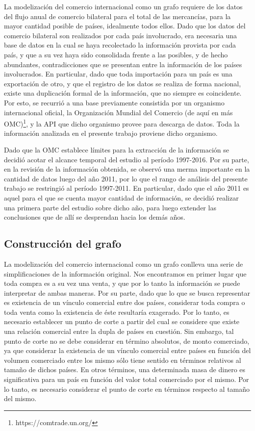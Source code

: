 \documentclass[runningheads,a4paper]{llncs}
\begin{document}
La modelización del comercio internacional como un grafo requiere de los datos del flujo anual de comercio bilateral para el total de las mercancías, para la mayor cantidad posible de países, idealmente todos ellos. Dado que los datos del comercio bilateral son realizados por cada país involucrado, era necesaria una base de datos en la cual se haya recolectado la información provista por cada país, y que a su vez haya sido consolidada frente a las posibles, y de hecho abundantes, contradicciones que se presentan entre la información de los países involucrados. En particular, dado que toda importación para un país es una exportación de otro, y que el registro de los datos se realiza de forma nacional, existe una duplicación formal de la información, que no siempre es coincidente. Por esto, se recurrió a una base previamente consistida por un organismo internacional oficial, la Organización Mundial del Comercio (de aquí en más OMC)\footnote{https://comtrade.un.org/}, y la API que dicho organismo provee para descarga de datos. Toda la información analizada en el presente trabajo proviene dicho organismo.   

Dado que la OMC establece límites para la extracción de la información se decidió acotar el alcance temporal del estudio al período 1997-2016. Por su parte, en la revisión de la información obtenida, se observó una merma importante en la cantidad de datos luego del año 2011, por lo que el rango de análisis del presente trabajo se restringió al período 1997-2011. En particular, dado que el año 2011 es aquel para el que se cuenta mayor cantidad de información, se decidió realizar una primera parte del estudio sobre dicho año, para luego extender las conclusiones que de allí se desprendan hacia los demás años.


\subsection{Construcción del grafo}

La modelización del comercio internacional como un grafo conlleva una serie de simplificaciones de la información original. Nos encontramos en primer lugar que toda compra es a su vez una venta, y que por lo tanto la información se puede interpretar de ambas maneras. Por su parte, dado que lo que se busca representar es existencia de un vínculo comercial entre dos países, considerar toda compra o toda venta como la existencia de éste resultaría exagerado. Por lo tanto, es necesario establecer un punto de corte a partir del cual se considere que existe una relación comercial entre la dupla de países en cuestión. Sin embargo, tal punto de corte no se debe considerar en término absolutos, de monto comerciado, ya que  considerar la existencia de un vínculo comercial entre países en función del volumen comerciado entre los mismo sólo tiene sentido en términos relativos al tamaño de dichos países. En otros términos, una determinada masa de dinero es significativa para un país en función del valor total comerciado por el mismo. Por lo tanto, es necesario considerar el punto de corte en términos respecto al tamaño del mismo.
\end{document}
